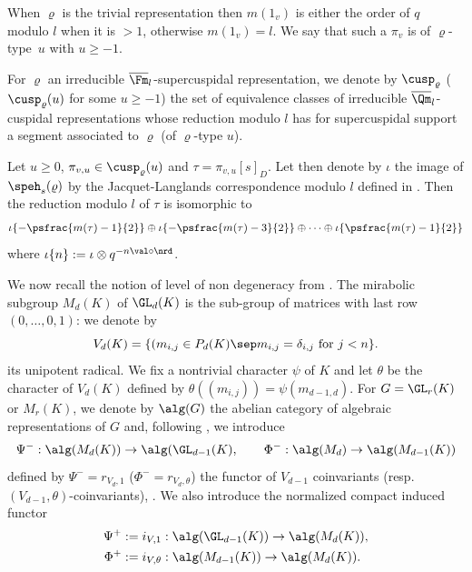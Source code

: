 \begin{remark}
When $\varrho$ is the trivial representation then $m(1_v)$ is either the order of $q$ modulo $l$
when it is $>1$, otherwise $m(1_v)=l$.
We say that such a $\pi_v$ is of $\varrho$-type~$u$ with $u \geq -1$.
\end{remark}


\begin{nota}
For $\varrho$ an irreducible $\overline \Fm_l$-supercuspidal representation, we denote by
$\cusp_\varrho$ (\resp $\cusp_\varrho(u)$ for some $u \geq -1$)
the set of equivalence classes of irreducible
$\overline \Qm_l$-cuspidal representations whose reduction modulo $l$ has
for supercuspidal
support a segment associated to $\varrho$ (\resp of $\varrho$-type $u$).
\end{nota}

Let $u \geq 0$, $\pi_{v,u} \in \cusp_{\varrho}(u)$ and $\tau=\pi_{v,u}[s]_{D}$. Let then denote
by $\iota$ the image of $\speh_s(\varrho)$ by the Jacquet-Langlands
correspondence modulo $l$
defined in \cite[\S 1.2.4]{dat-jl}. Then the reduction modulo $l$ of $\tau$ is isomorphic to
\begin{equation} \label{eq-red-tau}
\iota \{-\psfrac{m(\tau)-1}{2}\} \oplus \iota \{-\psfrac{m(\tau)-3}{2}\} \oplus \cdots \oplus \iota \{\psfrac{m(\tau)-1}{2}\}
\end{equation}
where $\iota \{n\}:=\iota \otimes q^{-n \val \circ \nrd}$.

We now recall the notion of level of non degeneracy from \cite[\S4]{zelevinski1}.
The mirabolic subgroup
$M_d(K)$ of $\GL_d(K)$ is the sub-group of matrices with last row $(0,\dots,0,1)$: we denote by
\[
V_d(K)=\{(m_{i,j} \in P_d(K)\sep m_{i,j}= \delta_{i,j} \hbox{ for } j < n\}.
\]
its unipotent radical. We fix a nontrivial character $\psi$ of $K$ and let $\theta$ be the
character of $V_d(K)$ defined by $\theta((m_{i,j}))=\psi(m_{d-1,d})$.
For $G=\GL_r(K)$ or $M_r(K)$, we denote by $\alg(G)$ the abelian category of algebraic
representations of $G$ and, following \cite{zelevinski1}, we introduce
\[
\Psi^-: \alg(M_d(K)) \to \alg(\GL_{d-1}(K), \qquad \Phi^-: \alg (M_d) \to
\alg (M_{d-1}(K))
\]
defined by $\Psi^-=r_{V_d,1}$ (\resp $\Phi^-=r_{V_d,\theta}$) the functor of $V_{d-1}$
coinvariants (resp.\ $(V_{d-1},\theta)$-coinvariants), \cf \cite[1.8]{zelevinski1}.
We also introduce the normalized compact induced functor
\begin{align*}
\Psi^+&:=i_{V,1}: \alg(\GL_{d-1}(K)) \to \alg (M_d(K)),
\\
\Phi^+&:=i_{V,\theta}: \alg(M_{d-1}(K)) \to \alg(M_d(K)).
\end{align*}


